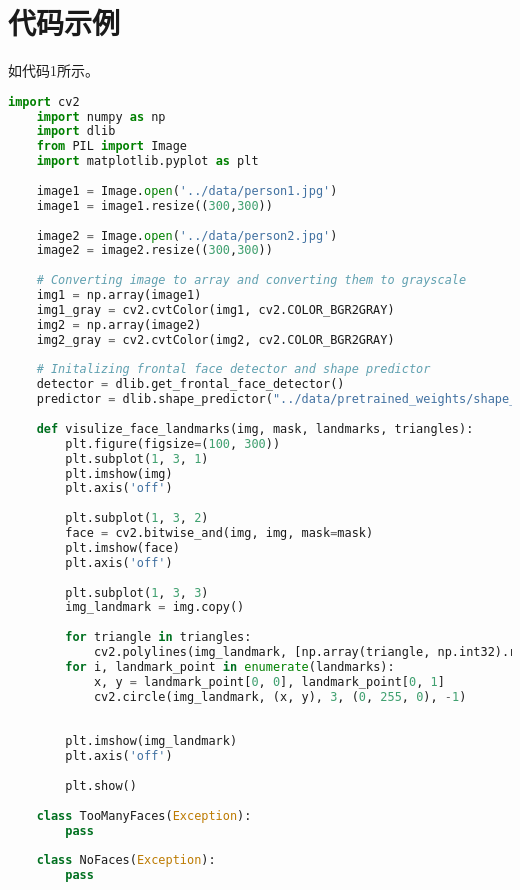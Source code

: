 \section{代码示例}

如代码1所示。

\begin{lstlisting}[caption={student.py}, label={lst:code-example}, captionpos=t, language=python]
    import cv2
    import numpy as np
    import dlib
    from PIL import Image 
    import matplotlib.pyplot as plt
    
    image1 = Image.open('../data/person1.jpg')
    image1 = image1.resize((300,300))
    
    image2 = Image.open('../data/person2.jpg')
    image2 = image2.resize((300,300))
    
    # Converting image to array and converting them to grayscale
    img1 = np.array(image1)
    img1_gray = cv2.cvtColor(img1, cv2.COLOR_BGR2GRAY)
    img2 = np.array(image2)
    img2_gray = cv2.cvtColor(img2, cv2.COLOR_BGR2GRAY)
    
    # Initalizing frontal face detector and shape predictor
    detector = dlib.get_frontal_face_detector()
    predictor = dlib.shape_predictor("../data/pretrained_weights/shape_predictor_68_face_landmarks.dat")
    
    def visulize_face_landmarks(img, mask, landmarks, triangles):
        plt.figure(figsize=(100, 300))
        plt.subplot(1, 3, 1)
        plt.imshow(img)
        plt.axis('off')
        
        plt.subplot(1, 3, 2)
        face = cv2.bitwise_and(img, img, mask=mask)
        plt.imshow(face)
        plt.axis('off')
        
        plt.subplot(1, 3, 3)
        img_landmark = img.copy()
        
        for triangle in triangles:
            cv2.polylines(img_landmark, [np.array(triangle, np.int32).reshape((-1, 1 ,2))], True, (255, 255, 255), 1)
        for i, landmark_point in enumerate(landmarks):
            x, y = landmark_point[0, 0], landmark_point[0, 1]
            cv2.circle(img_landmark, (x, y), 3, (0, 255, 0), -1)
    
        
        plt.imshow(img_landmark)
        plt.axis('off')
        
        plt.show()
        
    class TooManyFaces(Exception):
        pass
    
    class NoFaces(Exception):
        pass
    

\end{lstlisting}

